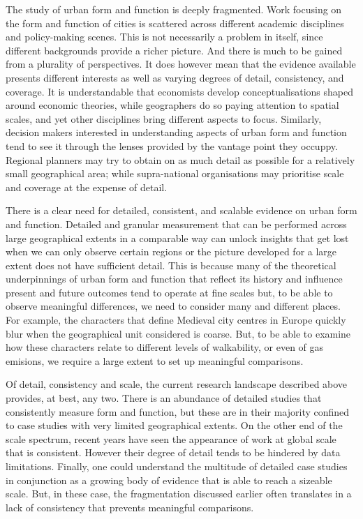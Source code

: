 The study of urban form and function is deeply fragmented.
Work focusing on the form and function of cities is scattered across
different academic disciplines and policy-making scenes. This is not
necessarily a problem in itself, since different backgrounds
provide a richer picture. And there is much to be gained from a plurality of
perspectives.
%
It does however mean that the evidence available presents different
interests as well as varying degrees of detail, consistency, and coverage.
It is understandable that economists develop conceptualisations shaped around
economic theories, while geographers do so paying attention to spatial scales,
and yet other disciplines bring different aspects to focus.
Similarly, decision makers interested in understanding aspects of urban form
and function tend to see it through the lenses provided by the vantage point
they occuppy. Regional planners may try to obtain on as much detail as
possible for a relatively small geographical area; while supra-national
organisations may prioritise scale and coverage at the expense of detail.

There is a clear need for detailed, consistent, and scalable evidence on urban
form and function.
Detailed and granular measurement that can be performed across large
geographical extents in a comparable way can unlock insights that get lost
when we can only observe certain regions or the picture developed for a large
extent does not have sufficient detail.
%
This is because many of the
theoretical underpinnings of urban form and function that reflect its history
and influence present and future outcomes tend to operate at fine scales but,
to be able to observe meaningful differences, we need to consider many and
different places.
%
For example, the characters that define Medieval city centres in Europe
quickly blur when the geographical unit considered is coarse. But, to be able to
examine how these characters relate to different levels of walkability, or
even of gas emisions, we require a large extent to set up meaningful
comparisons.

Of detail, consistency and scale, the current research landscape described above
provides, at best, any two.
%
There is an abundance of detailed studies that consistently measure form and
function, but these are in their majority confined to case studies with very
limited geographical extents.
%
On the other end of the scale spectrum, recent years have seen the appearance
of work at global scale that is consistent. However their degree of detail
tends to be hindered by data limitations.
%
Finally, one could understand the multitude of detailed case studies in
conjunction as a growing body of evidence that is able to reach a sizeable
scale. But, in these case, the fragmentation discussed earlier often
translates in a lack of consistency that prevents meaningful comparisons.

